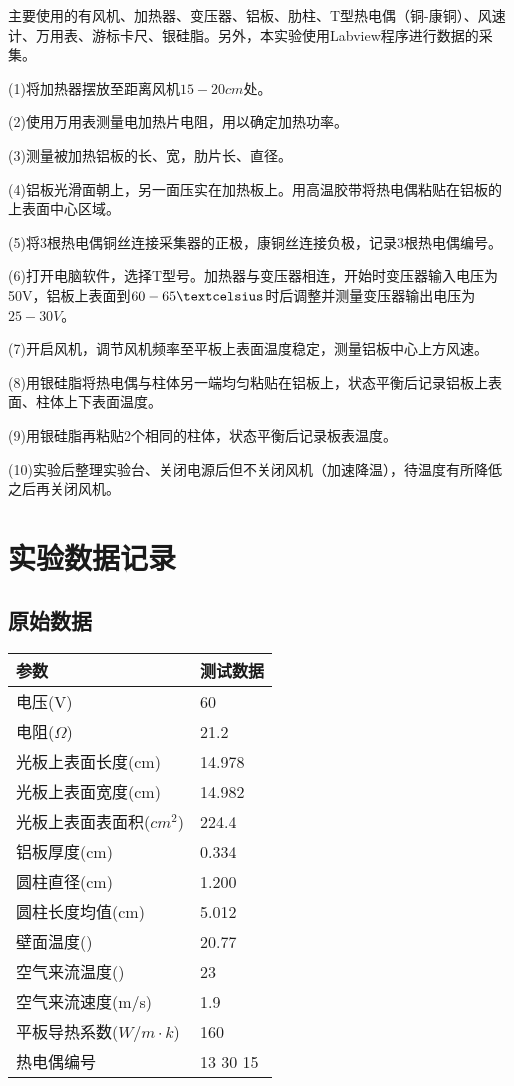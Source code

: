 \documentclass[UTF8,a4paper,10pt]{ctexart}
\begin{document}
	主要使用的有风机、加热器、变压器、铝板、肋柱、T型热电偶（铜-康铜）、风速计、万用表、游标卡尺、银硅脂。另外，本实验使用Labview程序进行数据的采集。
	
	(1)将加热器摆放至距离风机$15-20cm$处。
	
	(2)使用万用表测量电加热片电阻，用以确定加热功率。
	
	(3)测量被加热铝板的长、宽，肋片长、直径。
	
	(4)铝板光滑面朝上，另一面压实在加热板上。用高温胶带将热电偶粘贴在铝板的上表面中心区域。
	
	(5)将3根热电偶铜丝连接采集器的正极，康铜丝连接负极，记录3根热电偶编号。
	
	(6)打开电脑软件，选择T型号。加热器与变压器相连，开始时变压器输入电压为50V，铝板上表面到$60-65\textcelsius$时后调整并测量变压器输出电压为$25-30V$。
	
	(7)开启风机，调节风机频率至平板上表面温度稳定，测量铝板中心上方风速。
	
	(8)用银硅脂将热电偶与柱体另一端均匀粘贴在铝板上，状态平衡后记录铝板上表面、柱体上下表面温度。
	
	(9)用银硅脂再粘贴2个相同的柱体，状态平衡后记录板表温度。
	
	(10)实验后整理实验台、关闭电源后但不关闭风机（加速降温），待温度有所降低之后再关闭风机。
		
	\section{实验数据记录}
	\subsection{原始数据}
	\begin{table}[h]
		\begin{tabular}{|l|l|}
			\hline
			参数 & 测试数据 \\ \hline
			电压(V) & 60 \\ \hline
			电阻($\Omega$) & 21.2 \\ \hline
			光板上表面长度(cm) & 14.978 \\ \hline
			光板上表面宽度(cm) & 14.982 \\ \hline
			光板上表面表面积($cm^{2}$) & 224.4 \\ \hline
			铝板厚度(cm) & 0.334 \\ \hline
			圆柱直径(cm) & 1.200 \\ \hline
			圆柱长度均值(cm) & 5.012 \\ \hline
			壁面温度(\textcelsius) & 20.77 \\ \hline
			空气来流温度(\textcelsius) & 23 \\ \hline
			空气来流速度(m/s) & 1.9 \\ \hline
			平板导热系数($W/m\cdot{k}$) & 160 \\ \hline
			热电偶编号 & 13 30 15 \\ \hline
		\end{tabular}
	
	\end{table}
\end{document}
